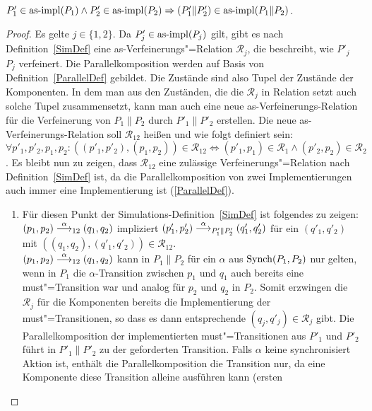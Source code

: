 \begin{Lem}\mbox{}\\
  \label{impParallelLem}
  $P'_1\in\mathrm{as}\text{-}\mathrm{impl} (P_1) \land P'_2 \in\mathrm{as}\text{-}\mathrm{impl} (P_2) \Rightarrow (P'_1\|P'_2)
  \in\mathrm{as}\text{-}\mathrm{impl} (P_1\|P_2)$.
\end{Lem}
\begin{proof}
  Es gelte $j\in\{1,2\}$. Da $P'_j\in\mathrm{as}\text{-}\mathrm{impl} (P_j)$ gilt, gibt es nach
  Definition~\ref{SimDef} eine as-Verfeinerungs"=Relation $\mathcal{R}_j$, die
  beschreibt, wie $P'_j$ $P_j$ verfeinert. Die Parallelkomposition werden
  auf Basis von Definition~\ref{ParallelDef} gebildet. Die Zustände sind also
  Tupel der Zustände der Komponenten. In dem man aus den Zuständen, die die
  $\mathcal{R}_j$ in Relation setzt auch solche Tupel zusammensetzt, kann man
  auch eine neue as-Verfeinerungs-Relation für die Verfeinerung von $P_1\|P_2$
  durch $P'_1\|P'_2$ erstellen. Die neue as-Verfeinerungs-Relation soll
  $\mathcal{R}_{12}$ heißen und wie folgt definiert sein:
  $\forall p'_1,p'_2,p_1,p_2: ((p'_1,p'_2),(p_1,p_2))\in\mathcal{R}_{12}
  \Leftrightarrow (p'_1,p_1)\in\mathcal{R}_1 \land (p'_2,p_2)\in\mathcal{R}_2$.
  Es bleibt nun zu zeigen, dass $\mathcal{R}_{12}$ eine zulässige
  Verfeinerungs"=Relation nach Definition~\ref{SimDef} ist, da die
  Parallelkomposition von zwei Implementierungen auch immer eine
  Implementierung ist (\ref{ParallelDef}).
  \begin{enumerate}
    \item Für diesen Punkt der Simulations-Definition~\ref{SimDef} ist
      folgendes zu zeigen: $(p_1,p_2)\must[\alpha]_{12}(q_1,q_2)$ impliziert
      $(p'_1,p'_2)\must[\alpha]_{P'_1\|P'_2}(q'_1,q'_2)$ für ein $(q'_1,q'_2)$
      mit $((q_1,q_2),(q'_1,q'_2))\in\mathcal{R}_{12}$.\\
      $(p_1,p_2)\must[\alpha]_{12}(q_1,q_2)$ kann in $P_1\|P_2$ für ein
      $\alpha$ aus $\mathrm{Synch} (P_1,P_2)$ nur gelten, wenn in $P_1$ die
      $\alpha$-Transition zwischen $p_1$ und $q_1$ auch bereits eine
      must"=Transition war und analog für $p_2$ und $q_2$ in $P_2$. Somit
      erzwingen die $\mathcal{R}_j$ für die Komponenten bereits die
      Implementierung der must"=Transitionen, so dass es dann entsprechende
      $(q_j,q'_j)\in\mathcal{R}_j$ gibt. Die Parallelkomposition der
      implementierten must"=Transitionen aus $P'_1$ und $P'_2$ führt in
      $P'_1\|P'_2$ zu der geforderten Transition. Falls $\alpha$ keine
      synchronisiert Aktion ist, enthält die Parallelkomposition die Transition
      nur, da eine Komponente diese Transition alleine ausführen kann (ersten

\end{enumerate}
\end{proof}
